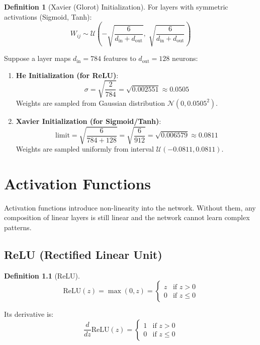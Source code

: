 \documentclass[12pt, a4paper]{report}
\theoremstyle{definition}
\newtheorem{definition}{Definition}[chapter]
\begin{document}
\begin{definition}[Xavier (Glorot) Initialization]
For layers with symmetric activations (Sigmoid, Tanh):
\begin{equation}
    W_{ij} \sim \mathcal{U}\left(-\sqrt{\frac{6}{d_\text{in} + d_\text{out}}},\; \sqrt{\frac{6}{d_\text{in} + d_\text{out}}}\right)
\end{equation}
\end{definition}

\begin{numexample}
Suppose a layer maps $d_\text{in} = 784$ features to $d_\text{out} = 128$ neurons:
\begin{enumerate}
    \item \textbf{He Initialization (for ReLU)}:
    \[
    \sigma = \sqrt{\frac{2}{784}} = \sqrt{0.002551} \approx \boxed{0.0505}
    \]
    Weights are sampled from Gaussian distribution $\mathcal{N}(0, 0.0505^2)$.
    
    \item \textbf{Xavier Initialization (for Sigmoid/Tanh)}:
    \[
    \text{limit} = \sqrt{\frac{6}{784 + 128}} = \sqrt{\frac{6}{912}} = \sqrt{0.006579} \approx \boxed{0.0811}
    \]
    Weights are sampled uniformly from interval $\mathcal{U}(-0.0811, 0.0811)$.
\end{enumerate}
\end{numexample}


\chapter{Activation Functions}

Activation functions introduce non-linearity into the network. Without them, any composition of linear layers is still linear and the network cannot learn complex patterns.

\section{ReLU (Rectified Linear Unit)}

\begin{definition}[ReLU]
\begin{equation}
    \text{ReLU}(z) = \max(0, z) = \begin{cases} z & \text{if } z > 0 \\ 0 & \text{if } z \leq 0 \end{cases}
\end{equation}

Its derivative is:
\begin{equation}
    \frac{d}{dz}\text{ReLU}(z) = \begin{cases} 1 & \text{if } z > 0 \\ 0 & \text{if } z \leq 0 \end{cases}
\end{equation}
\end{definition}
\end{document}
